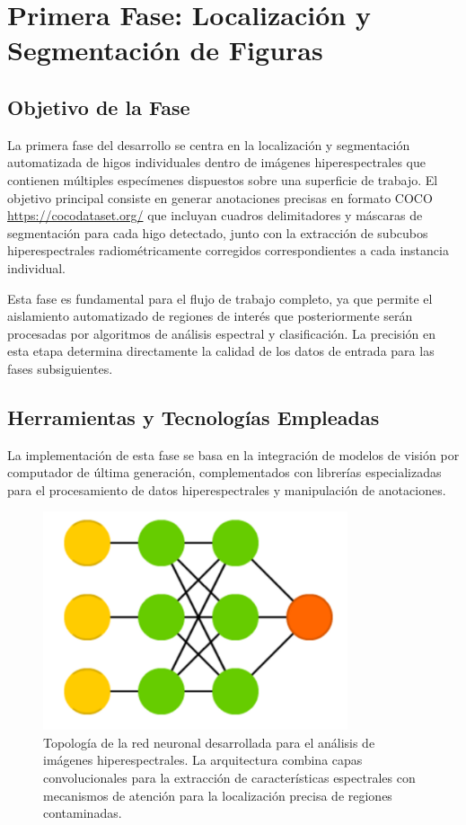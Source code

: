 \section{Primera Fase: Localización y Segmentación de Figuras}

\subsection{Objetivo de la Fase}

La primera fase del desarrollo se centra en la localización y segmentación automatizada de higos individuales dentro de imágenes hiperespectrales que contienen múltiples especímenes dispuestos sobre una superficie de trabajo. El objetivo principal consiste en generar anotaciones precisas en formato COCO \textcolor{blue}{\url{https://cocodataset.org/}} que incluyan cuadros delimitadores y máscaras de segmentación para cada higo detectado, junto con la extracción de subcubos hiperespectrales radiométricamente corregidos correspondientes a cada instancia individual.

Esta fase es fundamental para el flujo de trabajo completo, ya que permite el aislamiento automatizado de regiones de interés que posteriormente serán procesadas por algoritmos de análisis espectral y clasificación. La precisión en esta etapa determina directamente la calidad de los datos de entrada para las fases subsiguientes.

\subsection{Herramientas y Tecnologías Empleadas}
\label{docker}

La implementación de esta fase se basa en la integración de modelos de visión por computador de última generación, complementados con librerías especializadas para el procesamiento de datos hiperespectrales y manipulación de anotaciones.

\begin{figure}[!ht]
\centering
\includegraphics[width=0.8\textwidth]{images/topologia.png}
\caption{Topología de la red neuronal desarrollada para el análisis de imágenes hiperespectrales. La arquitectura combina capas convolucionales para la extracción de características espectrales con mecanismos de atención para la localización precisa de regiones contaminadas.}
\label{fig:topologia_red}
\end{figure}

